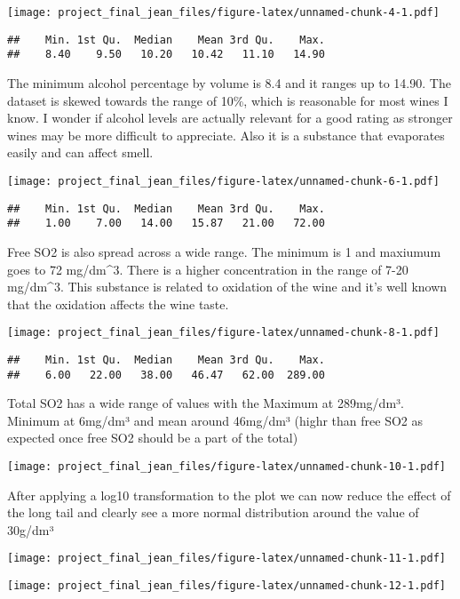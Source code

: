 \documentclass[]{article}
\begin{document}
\texttt{[image: project\_final\_jean\_files/figure-latex/unnamed-chunk-4-1.pdf]}

\begin{verbatim}
##    Min. 1st Qu.  Median    Mean 3rd Qu.    Max. 
##    8.40    9.50   10.20   10.42   11.10   14.90
\end{verbatim}

The minimum alcohol percentage by volume is 8.4 and it ranges up to
14.90. The dataset is skewed towards the range of 10\%, which is
reasonable for most wines I know. I wonder if alcohol levels are
actually relevant for a good rating as stronger wines may be more
difficult to appreciate. Also it is a substance that evaporates easily
and can affect smell.

\texttt{[image: project\_final\_jean\_files/figure-latex/unnamed-chunk-6-1.pdf]}

\begin{verbatim}
##    Min. 1st Qu.  Median    Mean 3rd Qu.    Max. 
##    1.00    7.00   14.00   15.87   21.00   72.00
\end{verbatim}

Free SO2 is also spread across a wide range. The minimum is 1 and
maxiumum goes to 72 mg/dm\^{}3. There is a higher concentration in the
range of 7-20 mg/dm\^{}3. This substance is related to oxidation of the
wine and it's well known that the oxidation affects the wine taste.

\texttt{[image: project\_final\_jean\_files/figure-latex/unnamed-chunk-8-1.pdf]}

\begin{verbatim}
##    Min. 1st Qu.  Median    Mean 3rd Qu.    Max. 
##    6.00   22.00   38.00   46.47   62.00  289.00
\end{verbatim}

Total SO2 has a wide range of values with the Maximum at 289mg/dm³.
Minimum at 6mg/dm³ and mean around 46mg/dm³ (highr than free SO2 as
expected once free SO2 should be a part of the total)

\texttt{[image: project\_final\_jean\_files/figure-latex/unnamed-chunk-10-1.pdf]}

After applying a log10 transformation to the plot we can now reduce the
effect of the long tail and clearly see a more normal distribution
around the value of 30g/dm³

\texttt{[image: project\_final\_jean\_files/figure-latex/unnamed-chunk-11-1.pdf]}

\texttt{[image: project\_final\_jean\_files/figure-latex/unnamed-chunk-12-1.pdf]}
\end{document}
